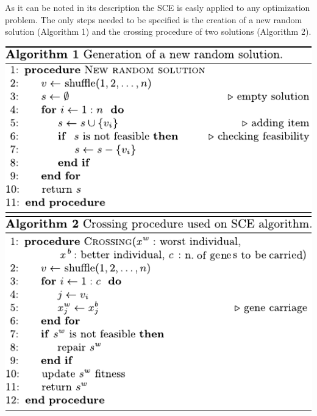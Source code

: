 As it can be noted in its description the SCE is easly applied to any
optimization problem.
The only steps needed to be specified is the creation of a new random
solution (Algorithm 1) and the crossing procedure of two solutions (Algorithm 2).
\begin{center}
\includegraphics[width=0.95\linewidth]{imgs/alg-new}\\[3mm]
\includegraphics[width=0.95\linewidth]{imgs/alg-cross}
\end{center}
